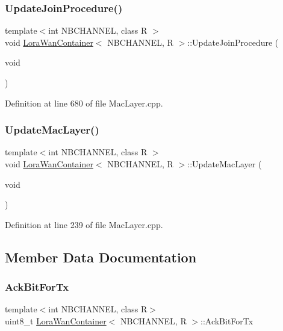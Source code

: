 \subsubsection{\texorpdfstring{Update\+Join\+Procedure()}{UpdateJoinProcedure()}}
{\footnotesize\ttfamily template$<$int N\+B\+C\+H\+A\+N\+N\+EL, class R $>$ \\
void \mbox{\hyperlink{class_lora_wan_container}{Lora\+Wan\+Container}}$<$ N\+B\+C\+H\+A\+N\+N\+EL, R $>$\+::Update\+Join\+Procedure (\begin{DoxyParamCaption}\item[{void}]{ }\end{DoxyParamCaption})}



Definition at line 680 of file Mac\+Layer.\+cpp.

\mbox{\label{class_lora_wan_container_a99e0d080f7a2bd65252d688e2a4befa1}} 
\subsubsection{\texorpdfstring{Update\+Mac\+Layer()}{UpdateMacLayer()}}
{\footnotesize\ttfamily template$<$int N\+B\+C\+H\+A\+N\+N\+EL, class R $>$ \\
void \mbox{\hyperlink{class_lora_wan_container}{Lora\+Wan\+Container}}$<$ N\+B\+C\+H\+A\+N\+N\+EL, R $>$\+::Update\+Mac\+Layer (\begin{DoxyParamCaption}\item[{void}]{ }\end{DoxyParamCaption})}



Definition at line 239 of file Mac\+Layer.\+cpp.



\subsection{Member Data Documentation}
\mbox{\label{class_lora_wan_container_ac150bed1ff68289d9eb4dcefdd840629}} 
\subsubsection{\texorpdfstring{Ack\+Bit\+For\+Tx}{AckBitForTx}}
{\footnotesize\ttfamily template$<$int N\+B\+C\+H\+A\+N\+N\+EL, class R$>$ \\
uint8\+\_\+t \mbox{\hyperlink{class_lora_wan_container}{Lora\+Wan\+Container}}$<$ N\+B\+C\+H\+A\+N\+N\+EL, R $>$\+::Ack\+Bit\+For\+Tx}



